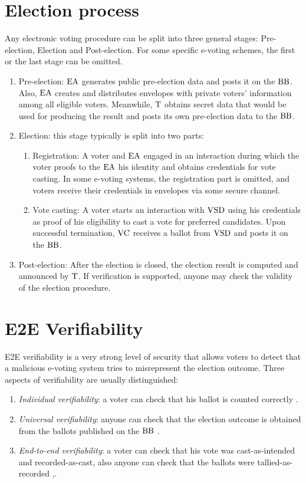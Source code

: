 \section{Election process}
Any electronic voting procedure can be split into three general stages: Pre-election, Election and Post-election. For some specific e-voting schemes, the first or the last stage can be omitted.
\begin{enumerate}
\item Pre-election: $\operatorname{EA}$ generates public pre-election data and posts it on the $\operatorname{BB}$. Also, $\operatorname{EA}$ creates and distributes envelopes with private voters' information among all eligible voters. Meanwhile, $\operatorname{T}$ obtains secret data that would be used for producing the result and posts its own pre-election data to the $\operatorname{BB}$.
\item Election: this stage typically is split into two parts:
\begin{enumerate}
\item Registration: A voter and $\operatorname{EA}$ engaged in an interaction during which the voter proofs to the $\operatorname{EA}$ his identity and obtains credentials for vote casting. In some e-voting systems, the registration part is omitted, and voters receive their credentials in envelopes via some secure channel. 
\item Vote casting: A voter starts an interaction with $\operatorname{VSD}$ using his credentials as proof of his eligibility to cast a vote for preferred candidates. Upon successful termination, $\operatorname{VC}$ receives a ballot from $\operatorname{VSD}$ and posts it on the $\operatorname{BB}$. 
\end{enumerate}
\item Post-election: After the election is closed, the election result is computed and announced by $\operatorname{T}$.  If verification is supported, anyone may check the validity of the election procedure. 
\end{enumerate}

\section{E2E Verifiability}
\label{e2e}
E2E verifiability is a very strong level of security that allows voters  to detect that a malicious e-voting system tries to misrepresent the election outcome. Three aspects of verifiability are usually distinguished:
\begin{enumerate}
\item \textit{Individual verifiability}: a voter can check that his ballot is counted correctly \cite{Chaum1981}.
\item \textit{Universal verifiability}: anyone can check that the election outcome is obtained from the ballots published on the $\operatorname{BB}$ \cite{Sako1995}.
\item \textit{End-to-end verifiability}: a voter can check that his vote was cast-as-intended and recorded-as-cast, also anyone can check that the ballots were tallied-as-recorded \cite{Neff2004},\cite{Chaum2004}.
\end{enumerate}

